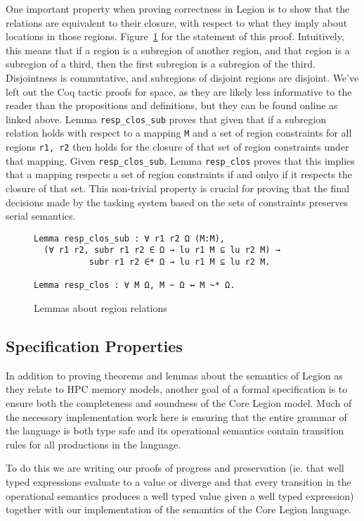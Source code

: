 \documentclass[sigconf]{acmart}
\begin{document}
One important property when proving correctness in Legion is to show that the
relations are equivalent to their closure, with respect to what they imply
about locations in those regions.  Figure~\ref{regionrelproof} for the
statement of this proof. Intuitively, this means that if a region is a
subregion of another region, and that region is a subregion of a third, then
the first subregion is a subregion of the third. Disjointness is commutative, 
and subregions of disjoint regions are disjoint. We've left out the Coq tactic
proofs for space, as they are likely less informative to the reader than the
propositions and definitions, but they can be found online as linked above. 
Lemma \texttt{resp\_clos\_sub} proves that given that if a subregion relation
holds with respect to a mapping \texttt{M} and a set of region constraints
 for all regions \texttt{r1, r2} then holds for the closure of that
set of region constraints under that mapping. Given \texttt{resp\_clos\_sub}, 
Lemma \texttt{resp\_clos} proves that this implies that a mapping respects
a set of region constraints if and onlyo if it respects the closure of that
set. This non-trivial property is crucial for proving that the final decisions 
made by the tasking system based on the sets of constraints preserves 
serial semantics. 

\begin{figure}
\centering
\begin{BVerbatim}
Lemma resp_clos_sub : ∀ r1 r2 Ω (M:M), 
  (∀ r1 r2, subr r1 r2 ∈ Ω → lu r1 M ⊆ lu r2 M) → 
           subr r1 r2 ∈* Ω → lu r1 M ⊆ lu r2 M.

Lemma resp_clos : ∀ M Ω, M ~ Ω ↔ M ~* Ω.
\end{BVerbatim}
\caption{Lemmas about region relations}
\label{regionrelproof}
\end{figure}

\subsection{Specification Properties}
In addition to proving theorems and lemmas about the semantics of Legion as
they relate to HPC memory models, another goal of a formal specification is to
ensure both the completeness and soundness of the Core Legion model. Much of
the necessary implementation work here is ensuring that the entire grammar of
the language is both type safe and its operational semantics contain transition
rules for all productions in the language.

To do this we are writing our proofs of progress and preservation (ie. that well
typed expressions evaluate to a value or diverge and that every transition in
the operational semantics produces a well typed value given a well typed
expression) together with our implementation of the semantics of the Core
Legion language.
\end{document}
